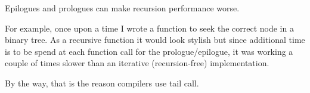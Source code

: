 \index{\Recursion}
{Epilogues and prologues can make recursion performance worse.}

{For example, once upon a time I wrote a function to seek the correct node in a binary tree. 
As a recursive function it would look stylish but since additional time
is to be spend at each function call
for the prologue/epilogue, it was working a couple of times slower than an iterative (recursion-free)
implementation.}

{By the way, that is the reason compilers use \gls{tail call}}.
